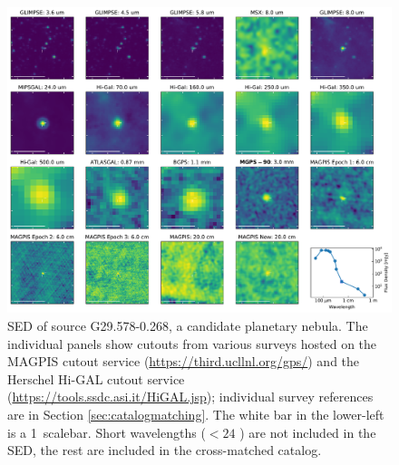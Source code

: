 \documentclass[twocolumn]{aastex62}
\begin{document}
\begin{figure}[htp]
\includegraphics[width=17cm]{figures/SED_plot_G29_G29.578-0.268.pdf}
\caption{SED of source G29.578-0.268, a candidate planetary nebula.  The
individual panels show cutouts from various surveys hosted on the MAGPIS cutout
service (\url{https://third.ucllnl.org/gps/}) and the Herschel Hi-GAL cutout
service (\url{https://tools.ssdc.asi.it/HiGAL.jsp}); individual survey
references are in Section \ref{sec:catalogmatching}.  The white bar in the
lower-left is a 1\arcmin\ scalebar.  Short wavelengths ($<24$ \um) are not
included in the SED, the rest are included in the cross-matched catalog.
}
\label{fig:g29pn}
\end{figure}
\end{document}
